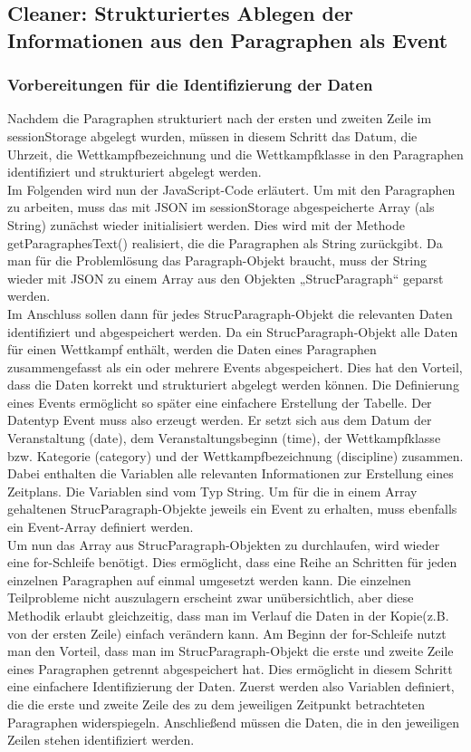 {\subsection{Cleaner: Strukturiertes Ablegen der Informationen aus den Paragraphen als Event}

\subsubsection{Vorbereitungen für die Identifizierung der Daten}
Nachdem die Paragraphen strukturiert nach der ersten und zweiten Zeile im sessionStorage abgelegt wurden, müssen in diesem Schritt das Datum, die Uhrzeit, die Wettkampfbezeichnung und die Wettkampfklasse in den Paragraphen identifiziert und strukturiert abgelegt werden. \\
Im Folgenden wird nun der JavaScript-Code erläutert. Um mit den Paragraphen zu arbeiten, muss das mit JSON im sessionStorage abgespeicherte Array (als String) zunächst wieder initialisiert werden. Dies wird mit der Methode getParagraphesText() realisiert, die die Paragraphen als String zurückgibt. Da man für die Problemlösung das Paragraph-Objekt braucht, muss der String wieder mit \ac{JSON} zu einem Array aus den Objekten „StrucParagraph“ geparst werden.\\
Im Anschluss sollen dann für jedes StrucParagraph-Objekt die relevanten Daten identifiziert und abgespeichert werden. Da ein StrucParagraph-Objekt alle Daten für einen Wettkampf enthält, werden die Daten eines Paragraphen zusammengefasst als ein oder mehrere Events abgespeichert. Dies hat den Vorteil, dass die Daten korrekt und strukturiert abgelegt werden können. Die Definierung eines Events ermöglicht so später eine einfachere Erstellung der Tabelle. Der Datentyp Event muss also erzeugt werden. Er setzt sich aus dem Datum der Veranstaltung (date), dem Veranstaltungsbeginn (time), der Wettkampfklasse bzw. Kategorie (category) und der Wettkampfbezeichnung (discipline) zusammen. Dabei enthalten die Variablen alle relevanten Informationen zur Erstellung eines Zeitplans. Die Variablen sind vom Typ String. Um für die in einem Array gehaltenen StrucParagraph-Objekte jeweils ein Event zu erhalten, muss ebenfalls ein Event-Array definiert werden.\\
Um nun das Array aus StrucParagraph-Objekten zu durchlaufen, wird wieder eine for-Schleife benötigt. Dies ermöglicht, dass eine Reihe an Schritten für jeden einzelnen Paragraphen auf einmal umgesetzt werden kann. Die einzelnen Teilprobleme nicht auszulagern erscheint zwar unübersichtlich, aber diese Methodik erlaubt gleichzeitig, dass man im Verlauf die Daten in der Kopie(z.B. von der ersten Zeile) einfach verändern kann. 
Am Beginn der for-Schleife nutzt man den Vorteil, dass man im StrucParagraph-Objekt die erste und zweite Zeile eines Paragraphen getrennt abgespeichert hat. Dies ermöglicht in diesem Schritt eine einfachere Identifizierung der Daten. Zuerst werden also Variablen definiert, die die erste und zweite Zeile des zu dem jeweiligen Zeitpunkt betrachteten Paragraphen widerspiegeln. Anschließend müssen die Daten, die in den jeweiligen Zeilen stehen identifiziert werden.

}
